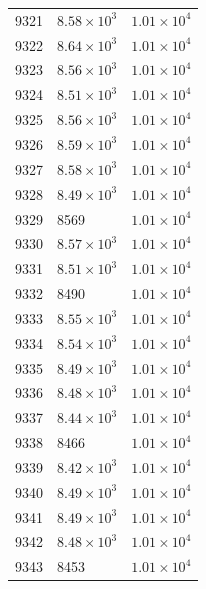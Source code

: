 \begin{table}[H]
\begin{tabular}{lll}
9321 & $\displaystyle 8.58 \times 10^{3}$ & $\displaystyle 1.01 \times 10^{4}$ \\
9322 & $\displaystyle 8.64 \times 10^{3}$ & $\displaystyle 1.01 \times 10^{4}$ \\
9323 & $\displaystyle 8.56 \times 10^{3}$ & $\displaystyle 1.01 \times 10^{4}$ \\
9324 & $\displaystyle 8.51 \times 10^{3}$ & $\displaystyle 1.01 \times 10^{4}$ \\
9325 & $\displaystyle 8.56 \times 10^{3}$ & $\displaystyle 1.01 \times 10^{4}$ \\
9326 & $\displaystyle 8.59 \times 10^{3}$ & $\displaystyle 1.01 \times 10^{4}$ \\
9327 & $\displaystyle 8.58 \times 10^{3}$ & $\displaystyle 1.01 \times 10^{4}$ \\
9328 & $\displaystyle 8.49 \times 10^{3}$ & $\displaystyle 1.01 \times 10^{4}$ \\
9329 & 8569 & $\displaystyle 1.01 \times 10^{4}$ \\
9330 & $\displaystyle 8.57 \times 10^{3}$ & $\displaystyle 1.01 \times 10^{4}$ \\
9331 & $\displaystyle 8.51 \times 10^{3}$ & $\displaystyle 1.01 \times 10^{4}$ \\
9332 & 8490 & $\displaystyle 1.01 \times 10^{4}$ \\
9333 & $\displaystyle 8.55 \times 10^{3}$ & $\displaystyle 1.01 \times 10^{4}$ \\
9334 & $\displaystyle 8.54 \times 10^{3}$ & $\displaystyle 1.01 \times 10^{4}$ \\
9335 & $\displaystyle 8.49 \times 10^{3}$ & $\displaystyle 1.01 \times 10^{4}$ \\
9336 & $\displaystyle 8.48 \times 10^{3}$ & $\displaystyle 1.01 \times 10^{4}$ \\
9337 & $\displaystyle 8.44 \times 10^{3}$ & $\displaystyle 1.01 \times 10^{4}$ \\
9338 & 8466 & $\displaystyle 1.01 \times 10^{4}$ \\
9339 & $\displaystyle 8.42 \times 10^{3}$ & $\displaystyle 1.01 \times 10^{4}$ \\
9340 & $\displaystyle 8.49 \times 10^{3}$ & $\displaystyle 1.01 \times 10^{4}$ \\
9341 & $\displaystyle 8.49 \times 10^{3}$ & $\displaystyle 1.01 \times 10^{4}$ \\
9342 & $\displaystyle 8.48 \times 10^{3}$ & $\displaystyle 1.01 \times 10^{4}$ \\
9343 & 8453 & $\displaystyle 1.01 \times 10^{4}$ \\

\end{tabular}
\end{table}
